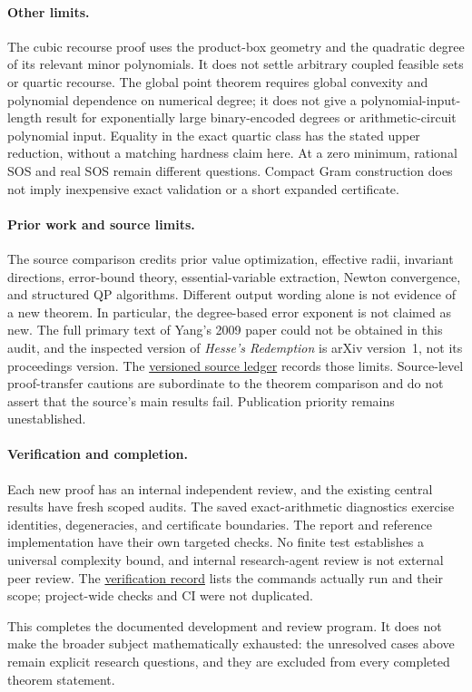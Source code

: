 \paragraph{Other limits.}
The cubic recourse proof uses the product-box geometry and the quadratic
degree of its relevant minor polynomials. It does not settle arbitrary
coupled feasible sets or quartic recourse. The global point theorem requires
global convexity and polynomial dependence on numerical degree; it does not
give a polynomial-input-length result for exponentially large binary-encoded
degrees or arithmetic-circuit polynomial input. Equality in the exact
quartic class has the stated upper reduction, without a matching hardness
claim here. At a zero minimum, rational SOS and real SOS remain different
questions. Compact Gram construction does not imply inexpensive exact
validation or a short expanded certificate.

\paragraph{Prior work and source limits.}
The source comparison credits prior value optimization, effective radii,
invariant directions, error-bound theory, essential-variable extraction,
Newton convergence, and structured QP algorithms. Different output wording
alone is not evidence of a new theorem. In particular, the degree-based
error exponent is not claimed as new. The full primary text of Yang's 2009
paper could not be obtained in this audit, and the inspected version of
\emph{Hesse's Redemption} is arXiv version~1, not its proceedings version.
The \href{../literature/source-ledger.md}{versioned source ledger} records
those limits. Source-level proof-transfer cautions are subordinate to the
theorem comparison and do not assert that the source's main results fail.
Publication priority remains unestablished.

\paragraph{Verification and completion.}
Each new proof has an internal independent review, and the existing central
results have fresh scoped audits. The saved exact-arithmetic diagnostics
exercise identities, degeneracies, and certificate boundaries. The report
and reference implementation have their own targeted checks. No finite
test establishes a universal complexity bound, and internal research-agent
review is not external peer review. The
\href{../VERIFICATION.md}{verification record} lists the commands actually
run and their scope; project-wide checks and CI were not duplicated.

This completes the documented development and review program. It does not
make the broader subject mathematically exhausted: the unresolved cases
above remain explicit research questions, and they are excluded from every
completed theorem statement.
